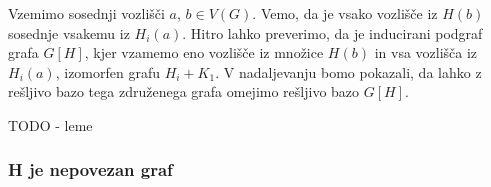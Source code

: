 \documentclass[mat1, tisk]{fmfdelo}
\newcommand{\1}{(1, 1, \ldots, 1)}
\newcommand{\2}{(2, 2, \ldots, 2)}
\begin{document}
Vzemimo sosednji vozlišči $a$, $b \in V(G)$. Vemo, da je vsako vozlišče iz $H(b)$ 
sosednje vsakemu iz $H_i(a).$ 
Hitro lahko preverimo, da je inducirani podgraf grafa $G[H]$, kjer vzamemo eno 
vozlišče iz množice $H(b)$ in vsa vozlišča iz $H_i(a)$, izomorfen grafu $H_i + K_1.$ 
V nadaljevanju bomo pokazali, da lahko z rešljivo bazo tega združenega grafa
omejimo rešljivo bazo $G[H]$.

TODO - leme


        
        
        





\subsubsection{H je nepovezan graf} \label{sss:nepovezan}
\end{document}
